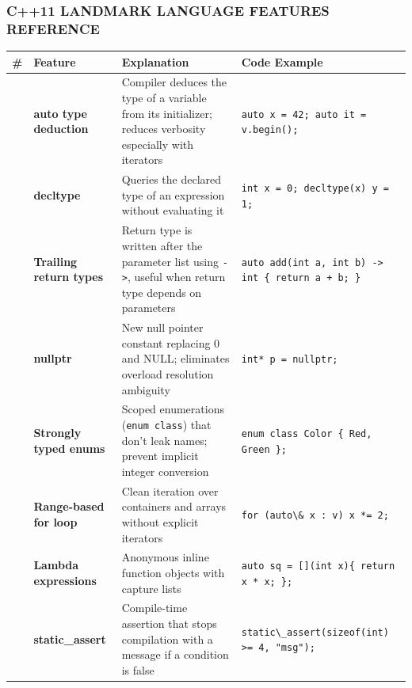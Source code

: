 \hypertarget{c11-landmark-language-features-reference}{%
\subsubsection{C++11 LANDMARK LANGUAGE FEATURES
REFERENCE}\label{c11-landmark-language-features-reference}}

\begin{longtable}[]{@{}
  >{\raggedright\arraybackslash}p{}
  >{\raggedright\arraybackslash}p{}
  >{\raggedright\arraybackslash}p{}
  >{\raggedright\arraybackslash}p{}@{}}
\toprule
\# & Feature & Explanation & Code Example \\
\midrule
\endhead
1 & \textbf{auto type deduction} & Compiler deduces the type of a
variable from its initializer; reduces verbosity especially with
iterators &
\passthrough{\lstinline!auto x = 42; auto it = v.begin();!} \\
2 & \textbf{decltype} & Queries the declared type of an expression
without evaluating it &
\passthrough{\lstinline!int x = 0; decltype(x) y = 1;!} \\
3 & \textbf{Trailing return types} & Return type is written after the
parameter list using \passthrough{\lstinline!->!}, useful when return
type depends on parameters &
\passthrough{\lstinline!auto add(int a, int b) -> int \{ return a + b; \}!} \\
4 & \textbf{nullptr} & New null pointer constant replacing 0 and NULL;
eliminates overload resolution ambiguity &
\passthrough{\lstinline!int* p = nullptr;!} \\
5 & \textbf{Strongly typed enums} & Scoped enumerations
(\passthrough{\lstinline!enum class!}) that don't leak names; prevent
implicit integer conversion &
\passthrough{\lstinline!enum class Color \{ Red, Green \};!} \\
6 & \textbf{Range-based for loop} & Clean iteration over containers and
arrays without explicit iterators &
\passthrough{\lstinline!for (auto\& x : v) x *= 2;!} \\
7 & \textbf{Lambda expressions} & Anonymous inline function objects with
capture lists &
\passthrough{\lstinline!auto sq = [](int x)\{ return x * x; \};!} \\
8 & \textbf{static\_assert} & Compile-time assertion that stops
compilation with a message if a condition is false &
\passthrough{\lstinline!static\_assert(sizeof(int) >= 4, "msg");!} \\

\end{longtable}
